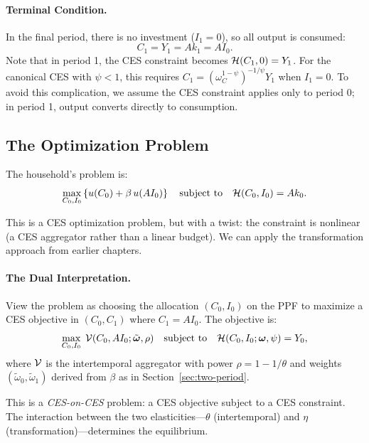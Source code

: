 \paragraph{Terminal Condition.}
In the final period, there is no investment ($I_1 = 0$), so all output is consumed:
\begin{equation}
C_1 = Y_1 = A k_1 = A I_0.
\label{eq:ac-terminal}
\end{equation}
Note that in period 1, the CES constraint becomes $\mathcal{H}(C_1, 0) = Y_1$. For the canonical CES with $\psi < 1$, this requires $C_1 = (\omega_C^{1-\psi})^{-1/\psi} Y_1$ when $I_1 = 0$. To avoid this complication, we assume the CES constraint applies only to period 0; in period 1, output converts directly to consumption.

\subsection{The Optimization Problem}
\label{subsec:ac-optimization}

The household's problem is:
\begin{equation}
\max_{C_0, I_0} \left\{ u(C_0) + \beta \, u(A I_0) \right\} \quad \text{subject to} \quad \mathcal{H}(C_0, I_0) = A k_0.
\label{eq:ac-problem}
\end{equation}

This is a CES optimization problem, but with a twist: the constraint is nonlinear (a CES aggregator rather than a linear budget). We can apply the transformation approach from earlier chapters.

\paragraph{The Dual Interpretation.}
View the problem as choosing the allocation $(C_0, I_0)$ on the PPF to maximize a CES objective in $(C_0, C_1)$ where $C_1 = A I_0$. The objective is:
\begin{equation}
\max_{C_0, I_0} \; \mathcal{V}(C_0, A I_0; \tilde{\boldsymbol{\omega}}, \rho) \quad \text{subject to} \quad \mathcal{H}(C_0, I_0; \boldsymbol{\omega}, \psi) = Y_0,
\label{eq:ac-dual-problem}
\end{equation}
where $\mathcal{V}$ is the intertemporal aggregator with power $\rho = 1 - 1/\theta$ and weights $(\tilde{\omega}_0, \tilde{\omega}_1)$ derived from $\beta$ as in Section~\ref{sec:two-period}.

This is a \emph{CES-on-CES} problem: a CES objective subject to a CES constraint. The interaction between the two elasticities---$\theta$ (intertemporal) and $\eta$ (transformation)---determines the equilibrium.

